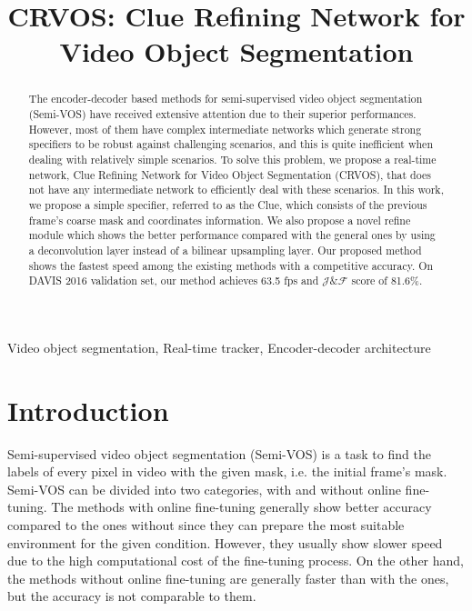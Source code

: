 \documentclass{article}
\title{CRVOS: Clue Refining Network for Video Object Segmentation}
\begin{document}
\maketitle
\begin{abstract}

The encoder-decoder based methods for semi-supervised video object segmentation (Semi-VOS) have received extensive attention due to their superior performances. However, most of them have complex intermediate networks which generate strong specifiers to be robust against challenging scenarios, and this is quite inefficient when dealing with relatively simple scenarios. To solve this problem, we propose a real-time network, Clue Refining Network for Video Object Segmentation (CRVOS), that does not have any intermediate network to efficiently deal with these scenarios. In this work, we propose a simple specifier, referred to as the Clue, which consists of the previous frame’s coarse mask and coordinates information. We also propose a novel refine module which shows the better performance compared with the general ones by using a deconvolution layer instead of a bilinear upsampling layer. Our proposed method shows the fastest speed among the existing methods with a competitive accuracy. On DAVIS 2016 validation set, our method achieves 63.5 fps and $\mathcal{J}\&\mathcal{F}$ score of 81.6\%. 

\end{abstract}
\begin{keywords}
Video object segmentation, Real-time tracker, Encoder-decoder architecture
\end{keywords}




\section{Introduction}
\label{intro}
Semi-supervised video object segmentation (Semi-VOS) is a task to find the labels of every pixel in video with the given mask, i.e. the initial frame's mask. Semi-VOS can be divided into two categories, with and without online fine-tuning. The methods with online fine-tuning \cite{caelles2017one, voigtlaender2017online, perazzi2017learning, hu2017maskrnn} generally show better accuracy compared to the ones without since they can prepare the most suitable environment for the given condition. However, they usually show slower speed due to the high computational cost of the fine-tuning process. On the other hand, the methods without online fine-tuning \cite{marki2016bilateral, jampani2017video, cheng2018fast, yang2018efficient} are generally faster than with the ones, but the accuracy is not comparable to them.
\end{document}
